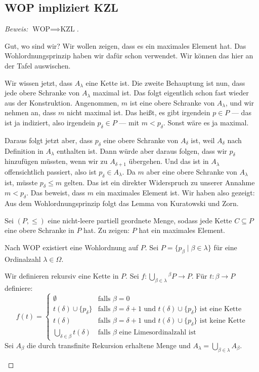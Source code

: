 \subsection{WOP impliziert KZL}

\begin{proof}[Beweis: $\text{WOP} \implies \text{KZL}$]
\begin{spoken-clean}[00:52:08 - 00:54:00]
Gut, wo sind wir? Wir wollen zeigen, dass es ein maximales Element hat. Das Wohlordnungsprinzip haben wir dafür schon verwendet. Wir können das hier an der Tafel auswischen.

Wir wissen jetzt, dass $A_\lambda$ eine Kette ist. Die zweite Behauptung ist nun, dass jede obere Schranke von $A_\lambda$ maximal ist. Das folgt eigentlich schon fast wieder aus der Konstruktion. Angenommen, $m$ ist eine obere Schranke von $A_\lambda$, und wir nehmen an, dass $m$ nicht maximal ist. Das heißt, es gibt irgendein $p \in P$ --- das ist ja indiziert, also irgendein $p_\delta \in P$ --- mit $m < p_\delta$. Sonst wäre es ja maximal.
\end{spoken-clean}

\begin{spoken-clean}[00:54:00 - 00:56:45]
Daraus folgt jetzt aber, dass $p_\delta$ eine obere Schranke von $A_\delta$ ist, weil $A_\delta$ nach Definition in $A_\lambda$ enthalten ist. Dann würde aber daraus folgen, dass wir $p_\delta$ hinzufügen müssten, wenn wir zu $A_{\delta+1}$ übergehen. Und das ist in $A_\lambda$ offensichtlich passiert, also ist $p_\delta \in A_\lambda$. Da $m$ aber eine obere Schranke von $A_\lambda$ ist, müsste $p_\delta \le m$ gelten. Das ist ein direkter Widerspruch zu unserer Annahme $m < p_\delta$. Das beweist, dass $m$ ein maximales Element ist. Wir haben also gezeigt: Aus dem Wohlordnungsprinzip folgt das Lemma von Kuratowski und Zorn.
\end{spoken-clean}

\begin{math-stroke}
Sei $(P, \le)$ eine nicht-leere partiell geordnete Menge, sodass jede Kette $C \subseteq P$ eine obere Schranke in $P$ hat.
Zu zeigen: $P$ hat ein maximales Element.

Nach $\text{WOP}$ existiert eine Wohlordnung auf $P$.
Sei $P = \{ p_\beta \mid \beta \in \lambda \}$ für eine Ordinalzahl $\lambda \in \Omega$.

Wir definieren rekursiv eine Kette in $P$.
Sei $f: \bigcup_{\beta \in \lambda} {}^{\beta}P \to P$.
Für $t: \beta \to P$ definiere:
\[
f(t) = \begin{cases}
\emptyset & \text{falls } \beta = 0 \\
t(\delta) \cup \{p_\delta\} & \text{falls } \beta = \delta+1 \text{ und } t(\delta) \cup \{p_\delta\} \text{ ist eine Kette} \\
t(\delta) & \text{falls } \beta = \delta+1 \text{ und } t(\delta) \cup \{p_\delta\} \text{ ist keine Kette} \\
\bigcup_{\delta \in \beta} t(\delta) & \text{falls } \beta \text{ eine Limesordinalzahl ist}
\end{cases}
\]
Sei $A_\beta$ die durch transfinite Rekursion erhaltene Menge und $A_\lambda = \bigcup_{\beta \in \lambda} A_\beta$.


\end{math-stroke}
\end{proof}
